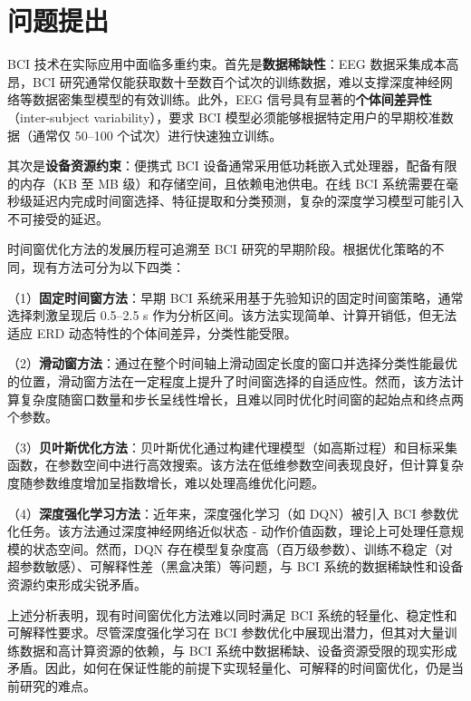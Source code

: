 \section{问题提出}
\label{sec:problem_statement}

BCI 技术在实际应用中面临多重约束。首先是\textbf{数据稀缺性}：EEG 数据采集成本高昂，BCI 研究通常仅能获取数十至数百个试次的训练数据，难以支撑深度神经网络等数据密集型模型的有效训练\cite{lotte2007review}。此外，EEG 信号具有显著的\textbf{个体间差异性}（inter-subject variability），要求 BCI 模型必须能够根据特定用户的早期校准数据（通常仅 50--100 个试次）进行快速独立训练\cite{lotte2011regularizing}。

其次是\textbf{设备资源约束}：便携式 BCI 设备通常采用低功耗嵌入式处理器，配备有限的内存（KB 至 MB 级）和存储空间，且依赖电池供电。在线 BCI 系统需要在毫秒级延迟内完成时间窗选择、特征提取和分类预测，复杂的深度学习模型可能引入不可接受的延迟。

时间窗优化方法的发展历程可追溯至 BCI 研究的早期阶段。根据优化策略的不同，现有方法可分为以下四类：

（1）\textbf{固定时间窗方法}：早期 BCI 系统采用基于先验知识的固定时间窗策略，通常选择刺激呈现后 0.5--2.5 s 作为分析区间\cite{mcfarland1997spatial}。该方法实现简单、计算开销低，但无法适应 ERD 动态特性的个体间差异，分类性能受限\cite{zhang2019temporally}。

（2）\textbf{滑动窗方法}：通过在整个时间轴上滑动固定长度的窗口并选择分类性能最优的位置，滑动窗方法在一定程度上提升了时间窗选择的自适应性\cite{yang2015time}。然而，该方法计算复杂度随窗口数量和步长呈线性增长，且难以同时优化时间窗的起始点和终点两个参数。

（3）\textbf{贝叶斯优化方法}：贝叶斯优化通过构建代理模型（如高斯过程）和目标采集函数，在参数空间中进行高效搜索\cite{yang2015time}。该方法在低维参数空间表现良好，但计算复杂度随参数维度增加呈指数增长，难以处理高维优化问题。

（4）\textbf{深度强化学习方法}：近年来，深度强化学习（如 DQN）被引入 BCI 参数优化任务\cite{chen2019dynamic, zhang2021mars}。该方法通过深度神经网络近似状态 - 动作价值函数，理论上可处理任意规模的状态空间。然而，DQN 存在模型复杂度高（百万级参数）、训练不稳定（对超参数敏感）、可解释性差（黑盒决策）等问题\cite{mnih2015human}，与 BCI 系统的数据稀缺性和设备资源约束形成尖锐矛盾。

上述分析表明，现有时间窗优化方法难以同时满足 BCI 系统的轻量化、稳定性和可解释性要求。尽管深度强化学习在 BCI 参数优化中展现出潜力，但其对大量训练数据和高计算资源的依赖，与 BCI 系统中数据稀缺、设备资源受限的现实形成矛盾。因此，如何在保证性能的前提下实现轻量化、可解释的时间窗优化，仍是当前研究的难点。

